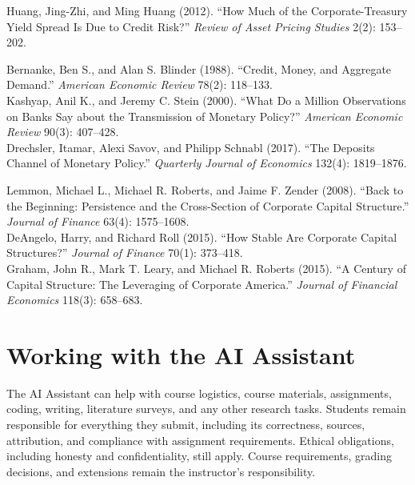 \documentclass[11pt]{article}
\begin{document}
\begin{description}[style=nextline,itemsep=5pt,topsep=4pt]
Huang, Jing-Zhi, and Ming Huang (2012). ``How Much of the Corporate-Treasury Yield Spread Is Due to Credit Risk?'' \textit{Review of Asset Pricing Studies} 2(2): 153--202.
\item[Wednesday, March 31: Monetary Policy and Banking] Bernanke, Ben S., and Alan S. Blinder (1988). ``Credit, Money, and Aggregate Demand.'' \textit{American Economic Review} 78(2): 118--133.\\
Kashyap, Anil K., and Jeremy C. Stein (2000). ``What Do a Million Observations on Banks Say about the Transmission of Monetary Policy?'' \textit{American Economic Review} 90(3): 407--428.\\
Drechsler, Itamar, Alexi Savov, and Philipp Schnabl (2017). ``The Deposits Channel of Monetary Policy.'' \textit{Quarterly Journal of Economics} 132(4): 1819--1876.
\item[Monday, April 5: Capital Structure] Lemmon, Michael L., Michael R. Roberts, and Jaime F. Zender (2008). ``Back to the Beginning: Persistence and the Cross-Section of Corporate Capital Structure.'' \textit{Journal of Finance} 63(4): 1575--1608.\\
DeAngelo, Harry, and Richard Roll (2015). ``How Stable Are Corporate Capital Structures?'' \textit{Journal of Finance} 70(1): 373--418.\\
Graham, John R., Mark T. Leary, and Michael R. Roberts (2015). ``A Century of Capital Structure: The Leveraging of Corporate America.'' \textit{Journal of Financial Economics} 118(3): 658--683.
\end{description}

\section*{Working with the AI Assistant}
The AI Assistant can help with course logistics, course materials, assignments, coding,
writing, literature surveys, and any other research tasks. Students remain
responsible for everything they submit, including its correctness, sources,
attribution, and compliance with assignment requirements. Ethical obligations,
including honesty and confidentiality, still apply. Course requirements, grading
decisions, and extensions remain the instructor's responsibility.
\end{document}
